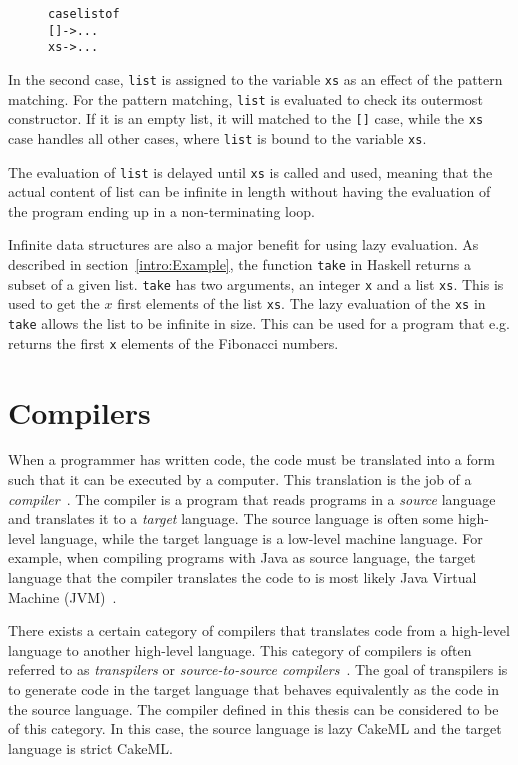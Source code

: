 \begin{figure}[H]
\begin{alltt}
  case list of
    [] -> ...
    xs -> ...
\end{alltt}
\end{figure}

\noindent In the second case, \texttt{list} is assigned to the variable
\texttt{xs} as an effect of the pattern matching. For the pattern matching,
\texttt{list} is evaluated to check its outermost constructor. If it is an empty
list, it will matched to the \texttt{[]} case, while the \texttt{xs} case
handles all other cases, where \texttt{list} is bound to the variable
\texttt{xs}.

The evaluation of
\texttt{list} is delayed until \texttt{xs} is called and used, meaning
that the actual content of list can be infinite in length without having the
evaluation of the program ending up in a non-terminating loop.

Infinite data structures are also a major benefit for using lazy evaluation.
As described in section~\ref{intro:Example}, the function \texttt{take}
in Haskell returns a subset of a given list. \texttt{take} has two arguments,
an integer \texttt{x} and a list \texttt{xs}. This is used to get the
$x$ first elements of the list \texttt{xs}. The lazy evaluation of the
\texttt{xs} in \texttt{take} allows the list to be infinite in size. This
can be used for a program that e.g. returns the first \texttt{x} elements of
the Fibonacci numbers.


\section{Compilers}
When a programmer has written code, the code must be translated into a form such
that it can be executed by a computer. This translation is the job of a
\textit{compiler}~\cite{DragonBook}. The compiler is a program that reads
programs in a \textit{source} language and translates it to a \textit{target}
language. The source language is often some high-level language, while the
target language is a low-level machine language.
For example, when compiling programs with Java as source language, the target
language that the compiler translates the code to is most likely Java Virtual
Machine (JVM)~\cite{JavaJVM}.

There exists a certain category of compilers that translates code from a
high-level language to another high-level language. This category of compilers
is often referred to as \textit{transpilers} or
\textit{source-to-source compilers}~\cite{kulkarnitranspiler}.
The goal of transpilers is to generate code in the target language that behaves
equivalently as the code in the source language. The compiler defined in this %
thesis can be considered to be of this category. In this case, the source
language is lazy CakeML and the target language is strict CakeML.

